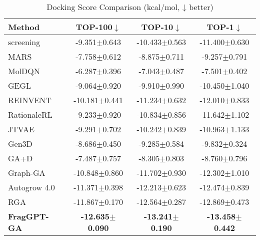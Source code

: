 \documentclass[lettersize,journal]{IEEEtran}
\begin{document}
\begin{table}[!t]
    \caption{Docking Score Comparison (kcal/mol, ↓ better)}
    \label{tab:docking_scores}
    \centering    
    \small
    \setlength{\tabcolsep}{4pt}
    
    \begin{tabular}{l c c c}
        \hline\hline
        Method & TOP-100$\downarrow$ & TOP-10$\downarrow$ & TOP-1$\downarrow$ \\
        \hline
        screening & -9.351$\pm$0.643 & -10.433$\pm$0.563 & -11.400$\pm$0.630 \\
        MARS & -7.758$\pm$0.612 & -8.875$\pm$0.711 & -9.257$\pm$0.791 \\
        MolDQN & -6.287$\pm$0.396 & -7.043$\pm$0.487 & -7.501$\pm$0.402 \\
        GEGL & -9.064$\pm$0.920 & -9.910$\pm$0.990 & -10.450$\pm$1.040 \\
        REINVENT & -10.181$\pm$0.441 & -11.234$\pm$0.632 & -12.010$\pm$0.833 \\
        RationaleRL & -9.233$\pm$0.920 & -10.834$\pm$0.856 & -11.642$\pm$1.102 \\
        JTVAE & -9.291$\pm$0.702 & -10.242$\pm$0.839 & -10.963$\pm$1.133 \\
        Gen3D & -8.686$\pm$0.450 & -9.285$\pm$0.584 & -9.832$\pm$0.324 \\
        GA+D & -7.487$\pm$0.757 & -8.305$\pm$0.803 & -8.760$\pm$0.796 \\
        Graph-GA & -10.848$\pm$0.860 & -11.702$\pm$0.930 & -12.302$\pm$1.010 \\
        Autogrow 4.0 & -11.371$\pm$0.398 & -12.213$\pm$0.623 & -12.474$\pm$0.839 \\
        RGA  & -11.867$\pm$0.170 & -12.564$\pm$0.287 & -12.869$\pm$0.473 \\             
        \hline
        \textbf{FragGPT-GA} & \textbf{-12.635$\pm$0.090} & \textbf{-13.241$\pm$0.190} & \textbf{-13.458$\pm$0.442} \\           
        \hline\hline
    \end{tabular}
\end{table}
\end{document}
